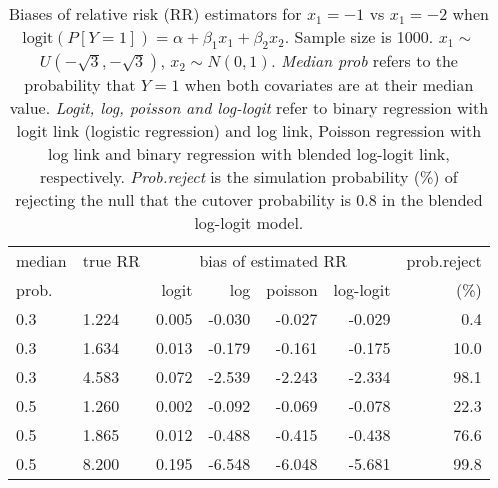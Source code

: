 \documentclass[12pt,a4paper]{article}
\begin{document}
\begin{table}[H] 
\small\sf\centering 
\caption{Biases of relative risk (RR) estimators for $x_1=-1$ vs $x_1=-2$ when $\mbox{logit}(P[Y=1])=\alpha+\beta_1 x_1 + \beta_2 x_2$. Sample size is 1000. $x_1 \sim $$U(-\sqrt{3},-\sqrt{3})$, $x_2 \sim N(0,1)$. {\it Median prob} refers to the probability that $Y=1$ when both covariates are at their median value. {\it Logit, log, poisson and log-logit} refer to binary regression with logit link (logistic regression) and log link, Poisson regression with log link and binary regression with blended log-logit link, respectively. {\it Prob.reject} is the simulation probability (\%) of rejecting the null that the cutover probability is $0.8$ in the blended log-logit model.} 
\begin{tabular}{llrrrrr} 
\toprule 
median & true RR & \multicolumn{4}{c}{bias of estimated RR} & prob.reject \\ 
prob. & & logit & log & poisson & log-logit  & (\%) \\ \midrule 
0.3 & 1.224 & 0.005 & -0.030 & -0.027 & -0.029 &  0.4 \\  
0.3 & 1.634 & 0.013 & -0.179 & -0.161 & -0.175 & 10.0 \\  
0.3 & 4.583 & 0.072 & -2.539 & -2.243 & -2.334 & 98.1 \\  
0.5 & 1.260 & 0.002 & -0.092 & -0.069 & -0.078 & 22.3 \\  
0.5 & 1.865 & 0.012 & -0.488 & -0.415 & -0.438 & 76.6 \\  
0.5 & 8.200 & 0.195 & -6.548 & -6.048 & -5.681 & 99.8 \\  
\bottomrule 
\end{tabular} 
\end{table} 
\end{document}
